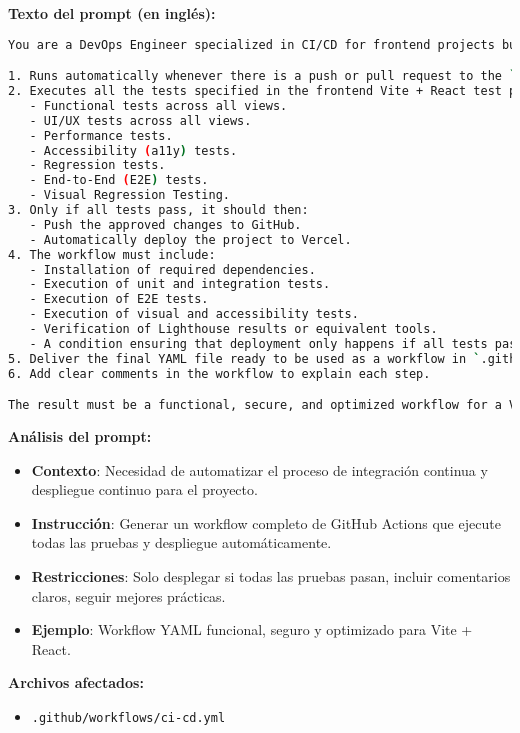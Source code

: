 \documentclass[12pt,a4paper]{article}
\begin{document}
\textbf{Texto del prompt (en inglés):}
\begin{lstlisting}[language=bash]
You are a DevOps Engineer specialized in CI/CD for frontend projects built with Vite + React. Your task is to generate a complete workflow using GitHub Actions that:

1. Runs automatically whenever there is a push or pull request to the `main` branch.
2. Executes all the tests specified in the frontend Vite + React test plan, including:
   - Functional tests across all views.
   - UI/UX tests across all views.
   - Performance tests.
   - Accessibility (a11y) tests.
   - Regression tests.
   - End-to-End (E2E) tests.
   - Visual Regression Testing.
3. Only if all tests pass, it should then:
   - Push the approved changes to GitHub.
   - Automatically deploy the project to Vercel.
4. The workflow must include:
   - Installation of required dependencies.
   - Execution of unit and integration tests.
   - Execution of E2E tests.
   - Execution of visual and accessibility tests.
   - Verification of Lighthouse results or equivalent tools.
   - A condition ensuring that deployment only happens if all tests pass.
5. Deliver the final YAML file ready to be used as a workflow in `.github/workflows/ci-cd.yml`.
6. Add clear comments in the workflow to explain each step.

The result must be a functional, secure, and optimized workflow for a Vite + React frontend project, following best practices for CI/CD and automated testing.
\end{lstlisting}

\textbf{Análisis del prompt:}
\begin{itemize}
    \item \textbf{Contexto}: Necesidad de automatizar el proceso de integración continua y despliegue continuo para el proyecto.
    \item \textbf{Instrucción}: Generar un workflow completo de GitHub Actions que ejecute todas las pruebas y despliegue automáticamente.
    \item \textbf{Restricciones}: Solo desplegar si todas las pruebas pasan, incluir comentarios claros, seguir mejores prácticas.
    \item \textbf{Ejemplo}: Workflow YAML funcional, seguro y optimizado para Vite + React.
\end{itemize}

\textbf{Archivos afectados:}
\begin{itemize}
    \item \texttt{.github/workflows/ci-cd.yml}
\end{itemize}
\end{document}
